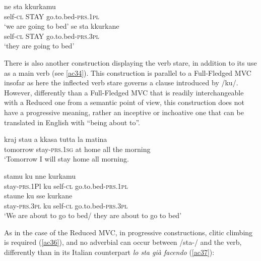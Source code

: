 \documentclass[output=paper]{langscibook}
\begin{document}
\ea\label{ac33}
    \ea\label{ac33a} \gll  ne   sta   kkurkamu \\ 
    self-\textsc{cl}  STAY   go.to.bed-\textsc{prs}.\textsc{1pl}\\
  \glt ‘we are going to bed’
    \ex\label{ac33b} \gll se    sta   kkurkane\\
   self-\textsc{cl}  STAY go.to.bed-\textsc{prs}.\textsc{3pl}\\
     \glt ‘they are going to bed’
 \z
\z

There is also another construction displaying the verb stare, in addition to its use as a main verb (see \ref{ac34}). This construction is parallel to a Full-Fledged MVC insofar as here the inflected verb stare governs a clause introduced by /ku/. However, differently than a Full-Fledged MVC that is readily interchangeable with a Reduced one from a semantic point of view, this construction does not have a progressive meaning, rather an inceptive or inchoative one that can be translated in English with “being about to”.

\ea \label{ac34}\gll kraj      stau       a  kkasa  tutta  la  matina\\
    tomorrow   stay-\textsc{prs}.\textsc{1sg} at home all   the  morning\\
 \glt ‘Tomorrow I will stay home all morning.
\z

\ea\label{ac35}
    \ea \label{ac35a}\gll stamu      ku  nne     kurkamu\\
    stay-\textsc{prs}.1Pl ku self-\textsc{cl}  go.to.bed-\textsc{prs}.\textsc{1pl}\\ 
    \ex \label{ac35b}\gll staune      ku  sse     kurkane\\
    stay-\textsc{prs}.\textsc{3pl} ku self-\textsc{cl}  go.to.bed-\textsc{prs}.\textsc{3pl}\\
    \glt ‘We are about to go to bed/ they are about to go to bed’
    \z
\z

As in the case of the Reduced MVC, in progressive constructions, clitic climbing is required (\ref{ac36}), and no adverbial can occur between /sta-/ and the verb, differently than in its Italian counterpart \textit{lo sta già facendo} (\ref{ac37}):

\ea\label{ac36}
    \z
\z
\end{document}
